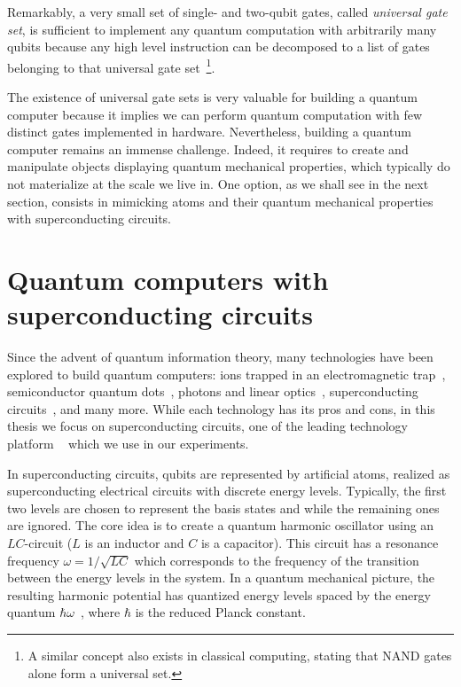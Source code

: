 Remarkably, a very small set of single- and two-qubit gates, called \textit{universal gate set}, is sufficient to implement any quantum computation with arbitrarily many qubits because any high level instruction can be decomposed to a list of gates belonging to that universal gate set~\cite{Nielsen2000QuantumInformation}\footnote{A similar concept also exists in classical computing, stating that NAND gates alone form a universal set.}.

The existence of universal gate sets is very valuable for building a quantum computer because it implies we can perform quantum computation with few distinct gates implemented in hardware. Nevertheless, building a quantum computer remains an immense challenge. Indeed, it requires to create and manipulate objects displaying quantum mechanical properties, which typically do not materialize at the scale we live in. One option, as we shall see in the next section, consists in mimicking atoms and their quantum mechanical properties with superconducting circuits.

\section{Quantum computers with superconducting circuits} \label{sec:intro_building_qc}
Since the advent of quantum information theory, many technologies have been explored to build quantum computers: ions trapped in an electromagnetic trap~\cite{Monroe1995DemonstrationGate}, semiconductor quantum dots~\cite{Loss1998QuantumDots}, photons and linear optics~\cite{Knill2001AOptics}, superconducting circuits~\cite{Blais2004CavityComputation}, and many more. While each technology has its pros and cons, in this thesis we focus on superconducting circuits, one of the leading technology platform ~\cite{Kjaergaard2019SuperconductingPlay} which we use in our experiments.

In superconducting circuits, qubits are represented by artificial atoms, realized as superconducting electrical circuits with discrete energy levels. Typically, the first two levels are chosen to represent the basis states \0 and \1  while the remaining ones are ignored. The core idea is to create a quantum harmonic oscillator using an $LC$-circuit ($L$ is an inductor and $C$ is a capacitor). This circuit has a resonance frequency $\omega = 1/\sqrt{LC}$ which corresponds to the frequency of the transition between the energy levels in the system. In a quantum mechanical picture, the resulting harmonic potential has quantized energy levels spaced by the energy quantum $\hbar\omega$~\cite{Kjaergaard2019SuperconductingPlay}, where $\hbar$ is the reduced Planck constant. 

